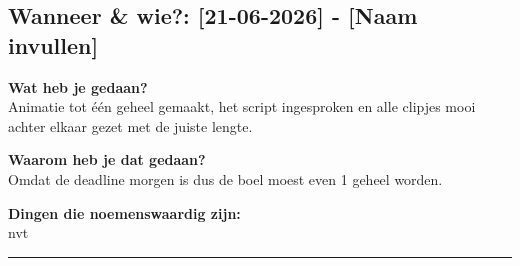 
\subsection*{Wanneer \& wie?: [21-06-2026] - [Naam invullen]}

\textbf{Wat heb je gedaan?}\\
Animatie tot één geheel gemaakt, het script ingesproken en alle clipjes mooi achter elkaar gezet met de juiste lengte.
\vspace{0.3cm} 

\noindent \textbf{Waarom heb je dat gedaan?}\\
Omdat de deadline morgen is dus de boel moest even 1 geheel worden.

\noindent \textbf{Dingen die noemenswaardig zijn:}\\
nvt


\vspace{0.5cm}
\hrule 
\vspace{0.5cm}